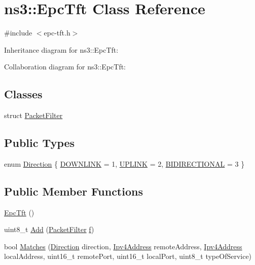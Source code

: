 \hypertarget{classns3_1_1EpcTft}{}\section{ns3\+:\+:Epc\+Tft Class Reference}
\label{classns3_1_1EpcTft}


{\ttfamily \#include $<$epc-\/tft.\+h$>$}



Inheritance diagram for ns3\+:\+:Epc\+Tft\+:


Collaboration diagram for ns3\+:\+:Epc\+Tft\+:
\subsection*{Classes}
\begin{DoxyCompactItemize}
\item 
struct \hyperlink{structns3_1_1EpcTft_1_1PacketFilter}{Packet\+Filter}
\end{DoxyCompactItemize}
\subsection*{Public Types}
\begin{DoxyCompactItemize}
\item 
enum \hyperlink{classns3_1_1EpcTft_a6037510585658e017a8011862ce56946}{Direction} \{ \hyperlink{classns3_1_1EpcTft_a6037510585658e017a8011862ce56946a2e647a08cf9f96c76b5379e3979f2cad}{D\+O\+W\+N\+L\+I\+NK} = 1, 
\hyperlink{classns3_1_1EpcTft_a6037510585658e017a8011862ce56946a5327d0aa05b24c5033cf3ae0f5156a26}{U\+P\+L\+I\+NK} = 2, 
\hyperlink{classns3_1_1EpcTft_a6037510585658e017a8011862ce56946af611445eba6a340fff2a86c6ad9252d4}{B\+I\+D\+I\+R\+E\+C\+T\+I\+O\+N\+AL} = 3
 \}
\end{DoxyCompactItemize}
\subsection*{Public Member Functions}
\begin{DoxyCompactItemize}
\item 
\hyperlink{classns3_1_1EpcTft_a9626d5d86dd5fdd59fd0e89a40d4c4ed}{Epc\+Tft} ()
\item 
uint8\+\_\+t \hyperlink{classns3_1_1EpcTft_a1228456a8abbe48cbc89bbe2d2e9af48}{Add} (\hyperlink{structns3_1_1EpcTft_1_1PacketFilter}{Packet\+Filter} \hyperlink{80211b_8c_ae7ffc1a8f84fa47a0812b2f2b9627132}{f})
\item 
bool \hyperlink{classns3_1_1EpcTft_a3c7a4801eaca4b023768a9158ae6e24a}{Matches} (\hyperlink{classns3_1_1EpcTft_a6037510585658e017a8011862ce56946}{Direction} direction, \hyperlink{classns3_1_1Ipv4Address}{Ipv4\+Address} remote\+Address, \hyperlink{classns3_1_1Ipv4Address}{Ipv4\+Address} local\+Address, uint16\+\_\+t remote\+Port, uint16\+\_\+t local\+Port, uint8\+\_\+t type\+Of\+Service)
\end{DoxyCompactItemize}
